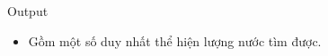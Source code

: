 Output  
\begin{itemize}
	\item     Gồm một số duy nhất thể hiện lượng nước tìm được.   
\end{itemize}